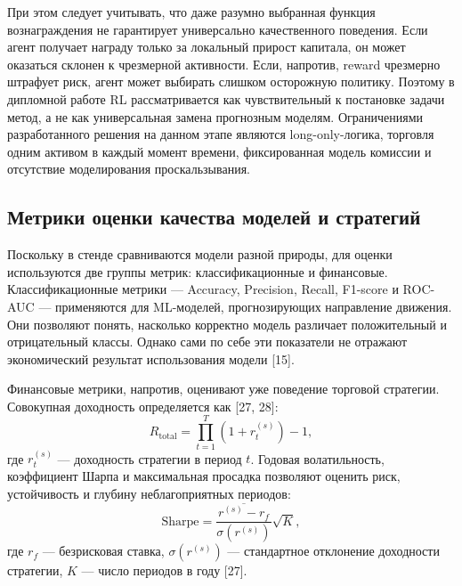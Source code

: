 При этом следует учитывать, что даже разумно выбранная функция вознаграждения не гарантирует универсально качественного поведения. Если агент получает награду только за локальный прирост капитала, он может оказаться склонен к чрезмерной активности. Если, напротив, reward чрезмерно штрафует риск, агент может выбирать слишком осторожную политику. Поэтому в дипломной работе RL рассматривается как чувствительный к постановке задачи метод, а не как универсальная замена прогнозным моделям. Ограничениями разработанного решения на данном этапе являются long-only-логика, торговля одним активом в каждый момент времени, фиксированная модель комиссии и отсутствие моделирования проскальзывания.

\subsection{Метрики оценки качества моделей и стратегий}

Поскольку в стенде сравниваются модели разной природы, для оценки используются две группы метрик: классификационные и финансовые. Классификационные метрики --- Accuracy, Precision, Recall, F1-score и ROC-AUC --- применяются для ML-моделей, прогнозирующих направление движения. Они позволяют понять, насколько корректно модель различает положительный и отрицательный классы. Однако сами по себе эти показатели не отражают экономический результат использования модели [15].

Финансовые метрики, напротив, оценивают уже поведение торговой стратегии. Совокупная доходность определяется как [27, 28]:
\begin{equation}
R_{\text{total}} = \prod_{t=1}^{T}(1 + r_t^{(s)}) - 1,
\end{equation}
где $r_t^{(s)}$ — доходность стратегии в период $t$. Годовая волатильность, коэффициент Шарпа и максимальная просадка позволяют оценить риск, устойчивость и глубину неблагоприятных периодов:
\begin{equation}
\text{Sharpe} = \frac{\overline{r^{(s)} - r_f}}{\sigma(r^{(s)})}\sqrt{K},
\end{equation}
где $r_f$ — безрисковая ставка, $\sigma(r^{(s)})$ — стандартное отклонение доходности стратегии, $K$ — число периодов в году [27].

\begin{table}[H]
\caption{Метрики, применяемые в исследовании}
\label{tab:metrics_overview}

\end{table}

